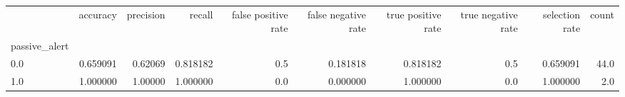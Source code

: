 \begin{tabular}{lrrrrrrrrr}
\toprule
{} &  accuracy &  precision &    recall &  false positive rate &  false negative rate &  true positive rate &  true negative rate &  selection rate &  count \\
passive\_alert &           &            &           &                      &                      &                     &                     &                 &        \\
\midrule
0.0           &  0.659091 &    0.62069 &  0.818182 &                  0.5 &             0.181818 &            0.818182 &                 0.5 &        0.659091 &   44.0 \\
1.0           &  1.000000 &    1.00000 &  1.000000 &                  0.0 &             0.000000 &            1.000000 &                 0.0 &        1.000000 &    2.0 \\
\bottomrule
\end{tabular}
